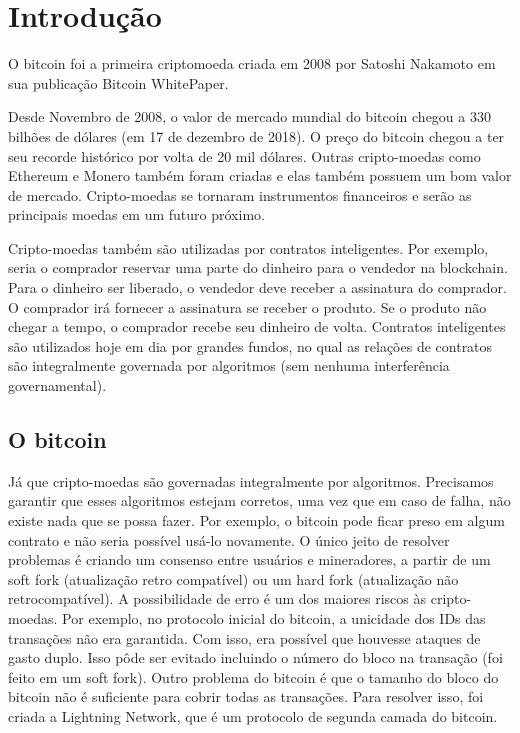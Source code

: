 \documentclass[12pt]{article}
\begin{document}
\tableofcontents
\pagebreak

\renewcommand{\thesection}{\arabic{section}}
\section{Introdução}

O bitcoin %
foi a primeira criptomoeda criada em 2008 por Satoshi Nakamoto em sua publicação Bitcoin WhitePaper.

Desde Novembro de 2008, o valor de mercado mundial do bitcoin chegou a 330 bilhões de dólares (em 17 de dezembro de 2018). O preço do bitcoin chegou a ter seu recorde histórico por volta de 20 mil dólares. Outras cripto-moedas como Ethereum e Monero também foram criadas e elas também possuem um bom valor de mercado. Cripto-moedas se tornaram instrumentos financeiros e serão as principais moedas em um futuro próximo.

Cripto-moedas também são utilizadas por contratos inteligentes. Por exemplo, seria o comprador reservar uma parte do dinheiro para o vendedor na blockchain. Para o dinheiro ser liberado, o vendedor deve receber a assinatura do comprador. O comprador irá fornecer a assinatura se receber o produto. Se o produto não chegar a tempo, o comprador recebe seu dinheiro de volta. Contratos inteligentes são utilizados hoje em dia por grandes fundos, no qual as relações de contratos são integralmente governada por algoritmos (sem nenhuma interferência governamental).

\subsection{O bitcoin}

Já que cripto-moedas são governadas integralmente por algoritmos.
Precisamos garantir que esses algoritmos estejam corretos, uma vez que em caso de falha,
não existe nada que se possa fazer. Por exemplo, o bitcoin pode ficar preso em algum contrato e não seria possível usá-lo novamente.
O único jeito de resolver problemas é criando um consenso entre usuários e mineradores,
a partir de um soft fork (atualização retro compatível) ou um hard fork (atualização não retrocompatível).
A possibilidade de erro é um dos maiores riscos às cripto-moedas.
Por exemplo, no protocolo inicial do bitcoin, a unicidade dos IDs das transações não era garantida.
Com isso, era possível que houvesse ataques de gasto duplo.
Isso pôde ser evitado incluindo o número do bloco na transação (foi feito em um soft fork).
Outro problema do bitcoin é que o tamanho do bloco do bitcoin não é suficiente para cobrir todas as transações.
Para resolver isso, foi criada a Lightning Network, que é um protocolo de segunda camada do bitcoin.
\end{document}
